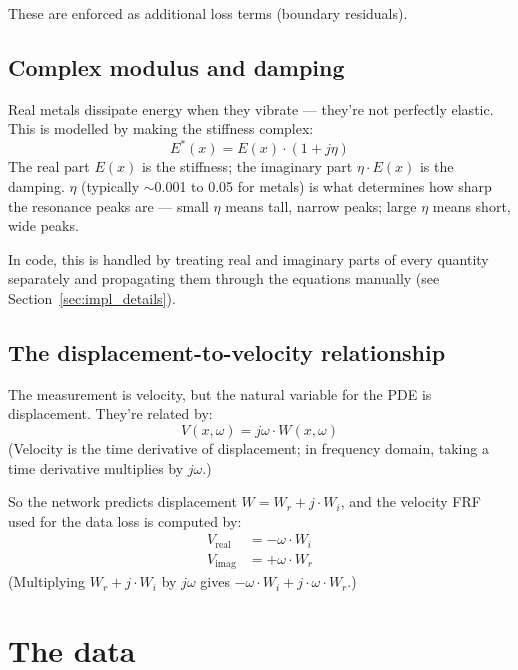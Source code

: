 \documentclass[11pt,a4paper]{article}
\begin{document}
These are enforced as additional loss terms (boundary residuals).

\subsection{Complex modulus and damping}

Real metals dissipate energy when they vibrate --- they're not perfectly elastic. This is modelled by making the stiffness complex:
\begin{equation}
E^*(x) = E(x) \cdot (1 + j\eta)
\label{eq:complex_modulus}
\end{equation}
The real part $E(x)$ is the stiffness; the imaginary part $\eta \cdot E(x)$ is the damping. $\eta$ (typically $\sim$0.001 to 0.05 for metals) is what determines how sharp the resonance peaks are --- small $\eta$ means tall, narrow peaks; large $\eta$ means short, wide peaks.

In code, this is handled by treating real and imaginary parts of every quantity separately and propagating them through the equations manually (see Section~\ref{sec:impl_details}).

\subsection{The displacement-to-velocity relationship}

The measurement is velocity, but the natural variable for the PDE is displacement. They're related by:
\begin{equation}
V(x, \omega) = j\omega \cdot W(x, \omega)
\label{eq:vel_disp}
\end{equation}
(Velocity is the time derivative of displacement; in frequency domain, taking a time derivative multiplies by $j\omega$.)

So the network predicts displacement $W = W_r + j \cdot W_i$, and the velocity FRF used for the data loss is computed by:
\begin{align}
V_\text{real} &= -\omega \cdot W_i \\
V_\text{imag} &= +\omega \cdot W_r
\end{align}
(Multiplying $W_r + j \cdot W_i$ by $j\omega$ gives $-\omega \cdot W_i + j \cdot \omega \cdot W_r$.)

\section{The data}
\end{document}
